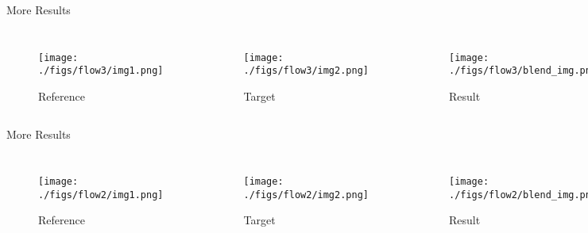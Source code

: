 \documentclass{beamer}
\begin{document}
\begin{frame}{More Results}
\begin{columns}[b]
\begin{figure}\texttt{[image: ./figs/flow3/img1.png]}\caption{Reference}\end{figure}
\begin{figure}\texttt{[image: ./figs/flow3/img2.png]}\caption{Target}\end{figure}
\begin{figure}\texttt{[image: ./figs/flow3/blend\_img.png]}\caption{Result}\end{figure}
\end{columns}
\vspace{0pt}
\end{frame}

\begin{frame}{More Results}
\begin{columns}[b]
\begin{figure}\texttt{[image: ./figs/flow2/img1.png]}\caption{Reference}\end{figure}
\begin{figure}\texttt{[image: ./figs/flow2/img2.png]}\caption{Target}\end{figure}
\begin{figure}\texttt{[image: ./figs/flow2/blend\_img.png]}\caption{Result}\end{figure}
\end{columns}
\vspace{0pt} 
\end{frame}

\end{document}
